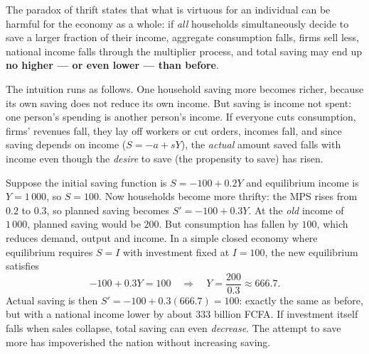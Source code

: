 \documentclass[11pt]{article}
\newcommand{\cle}[1]{{\popxbold\color{popdark}#1}}
\newcounter{popsec}
\newcounter{popsub}
\newcommand{\courssub}[1]{%
  \stepcounter{popsub}%
  \par\vspace{9pt}\noindent{\popxbold\fontsize{11.5}{13}\selectfont\color{popink}{\color{poporange}\thepopsec.\thepopsub}\hspace{6pt}#1}\par\nopagebreak\vspace{4pt}
}
\begin{document}
\courssub{The paradox of thrift}

\begin{definition}
The \cle{paradox of thrift} states that what is virtuous for an individual can be harmful for the economy as a whole: if \emph{all} households simultaneously decide to save a larger fraction of their income, aggregate consumption falls, firms sell less, national income falls through the multiplier process, and total saving may end up \textbf{no higher — or even lower — than before}.
\end{definition}

The intuition runs as follows. One household saving more becomes richer, because its own saving does not reduce its own income. But saving is income not spent: one person's spending is another person's income. If everyone cuts consumption, firms' revenues fall, they lay off workers or cut orders, incomes fall, and since saving depends on income ($S = -a + sY$), the \emph{actual} amount saved falls with income even though the \emph{desire} to save (the propensity to save) has risen.

\begin{exemplebox}
Suppose the initial saving function is $S = -100 + 0.2Y$ and equilibrium income is $Y = 1\,000$, so $S = 100$. Now households become more thrifty: the MPS rises from $0.2$ to $0.3$, so planned saving becomes $S' = -100 + 0.3Y$. At the \emph{old} income of $1\,000$, planned saving would be $200$. But consumption has fallen by $100$, which reduces demand, output and income. In a simple closed economy where equilibrium requires $S = I$ with investment fixed at $I = 100$, the new equilibrium satisfies
\[ -100 + 0.3Y = 100 \quad\Longrightarrow\quad Y = \frac{200}{0.3} \approx 666.7. \]
Actual saving is then $S' = -100 + 0.3(666.7) = 100$: exactly the same as before, but with a national income lower by about $333$ billion FCFA. If investment itself falls when sales collapse, total saving can even \emph{decrease}. The attempt to save more has impoverished the nation without increasing saving.
\end{exemplebox}
\end{document}
